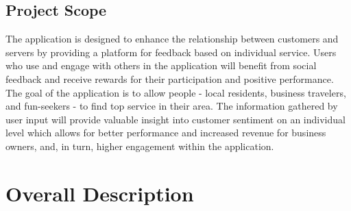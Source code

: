 \documentclass{scrreprt}
\begin{document}
\section{Project Scope}
The application is designed to enhance the relationship between customers and servers by providing a platform for feedback based on individual service. Users who use and engage with others in the application will benefit from social feedback and receive rewards for their participation and positive performance. The goal of the application is to allow people - local residents, business travelers, and fun-seekers - to find top service in their area. The information gathered by user input will provide valuable insight into customer sentiment on an individual level which allows for better performance and increased revenue for business owners, and, in turn, higher engagement within the application.

\chapter{Overall Description}


\end{document}
